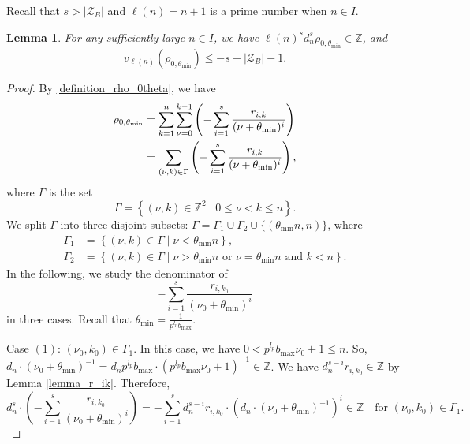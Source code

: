 \documentclass[12pt]{article}
\newtheorem{lemma}[theorem]{Lemma}
\numberwithin{equation}{section}
\begin{document}
\bigskip

Recall that $s>|\mathcal{Z}_B|$ and $\ell(n) = n+1$ is a prime number when $n \in I$. 

\begin{lemma}\label{lemma_rho_0theta_min}
For any sufficiently large $n \in I$, we have $\ell(n)^sd_n^s \rho_{0,\theta_{\min}} \in \mathbb{Z}$, and
\[ v_{\ell(n)}(\rho_{0,\theta_{\min}}) \leqslant  -s + |\mathcal{Z}_B| - 1. \]
\end{lemma}
	
\begin{proof}
By \eqref{definition_rho_0theta}, we have
\begin{align}
\rho_{0,\theta_{\min}} &= \sum_{k=1}^n\sum_{\nu=0}^{k-1} \left(-\sum_{i=1}^{s}\frac{r_{i,k}}{(\nu+\theta_{\min})^{i}} \right) \notag\\
&= \sum_{(\nu,k) \in \Gamma} \left(-\sum_{i=1}^{s}\frac{r_{i,k}}{(\nu+\theta_{\min})^{i}} \right), \label{eqn1}
\end{align}
where $\Gamma$ is the set
\[ \Gamma = \left\{ (\nu,k)\in\mathbb{Z}^2 \mid 0 \leqslant \nu < k \leqslant n \right\}. \]
We split $\Gamma$ into three disjoint subsets: $\Gamma = \Gamma_1 \cup \Gamma_2 \cup \{ (\theta_{\min}n,n) \}$, where
\begin{align*}
	\Gamma_1 &= \left\{ (\nu,k) \in \Gamma \mid \nu < \theta_{\min}n \right\}, \\
	\Gamma_2 &= \left\{ (\nu,k) \in \Gamma \mid \nu > \theta_{\min}n \text{~or~} \nu = \theta_{\min}n \text{~and~} k < n \right\}.
\end{align*}
In the following, we study the denominator of 
\[ -\sum_{i=1}^{s}\frac{r_{i,k_0}}{(\nu_0+\theta_{\min})^{i}} \]
in three cases. Recall that $\theta_{\min}=\frac{1}{p^{l_p}b_{\max}}$.

Case $(1)$: $(\nu_0,k_0) \in \Gamma_1$. In this case, we have $0<p^{l_p}b_{\max}\nu_0 + 1 \leqslant n$. So, $d_n \cdot (\nu_0 + \theta_{\min})^{-1} = d_n p^{l_p}b_{\max} \cdot (p^{l_p}b_{\max}\nu_0 + 1)^{-1} \in \mathbb{Z}$. We have $d_n^{s-i}r_{i,k_0} \in \mathbb{Z}$ by Lemma \ref{lemma_r_ik}. Therefore,
\begin{equation} \label{case_1}
d_n^s \cdot\left(-\sum_{i=1}^{s}\frac{r_{i,k_0}}{(\nu_0+\theta_{\min})^{i}}\right) = - \sum_{i=1}^{s} d_n^{s-i}r_{i,k_0} \cdot \left(d_n \cdot (\nu_0 + \theta_{\min})^{-1}\right)^i \in \mathbb{Z} \quad\text{for~} (\nu_0,k_0) \in \Gamma_1.
\end{equation}


\end{proof}
\end{document}
